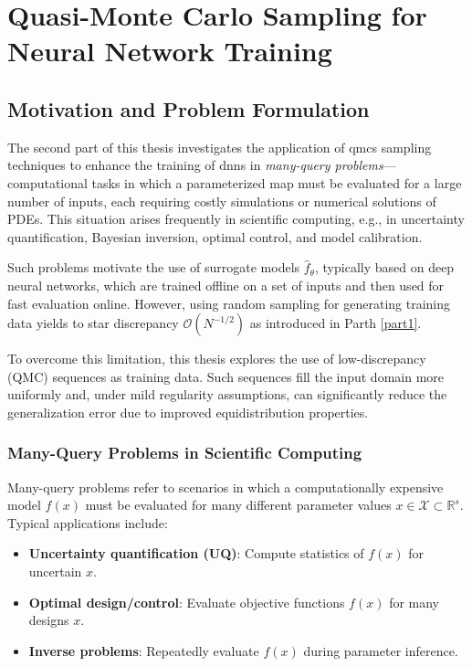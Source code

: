 \part{Quasi-Monte Carlo Sampling for Neural Network Training}
\label{part2}

\chapter{Motivation and Problem Formulation}
\label{chapter4}

The second part of this thesis investigates the application of \acfp{qmc}
sampling techniques to enhance the training of \acfp{dnn} in \emph{many-query
problems}—computational tasks in which a parameterized map must be evaluated for
a large number of inputs, each requiring costly simulations or numerical
solutions of PDEs. This situation arises frequently in scientific computing,
e.g., in uncertainty quantification, Bayesian inversion, optimal control, and
model calibration.

Such problems motivate the use of surrogate models $\hat{f}_\theta$, typically
based on deep neural networks, which are trained offline on a set of inputs and
then used for fast evaluation online. However, using random sampling for
generating training data yields to star discrepancy $\mathcal{O}(N^{-1/2})$ as
introduced in Parth \ref{part1}.

To overcome this limitation, this thesis explores the use of low-discrepancy
(QMC) sequences as training data. Such sequences fill the input domain more
uniformly and, under mild regularity assumptions, can significantly reduce the
generalization error due to improved equidistribution properties.

\section{Many-Query Problems in Scientific Computing}
Many-query problems refer to scenarios in which a computationally expensive
model $f(x)$ must be evaluated for many different parameter values $x \in
\mathcal{X} \subset \mathbb{R}^s$. Typical applications include:
\begin{itemize}
  \item \textbf{Uncertainty quantification (UQ)}: Compute statistics of $f(x)$
  for uncertain $x$.
  \item \textbf{Optimal design/control}: Evaluate objective functions $f(x)$ for
  many designs $x$.
  \item \textbf{Inverse problems}: Repeatedly evaluate $f(x)$ during parameter
  inference.
\end{itemize}

